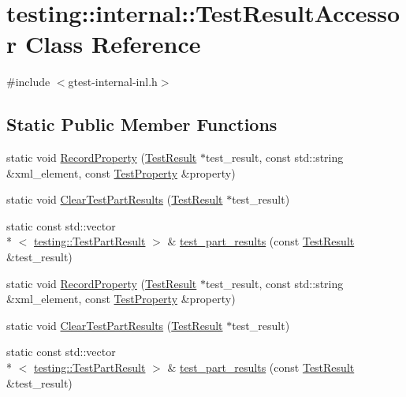 \hypertarget{classtesting_1_1internal_1_1_test_result_accessor}{\section{testing\-:\-:internal\-:\-:Test\-Result\-Accessor Class Reference}
\label{classtesting_1_1internal_1_1_test_result_accessor}
}


{\ttfamily \#include $<$gtest-\/internal-\/inl.\-h$>$}

\subsection*{Static Public Member Functions}
\begin{DoxyCompactItemize}
\item 
static void \hyperlink{classtesting_1_1internal_1_1_test_result_accessor_abcc4b32d1b201eeef92f0ec0ae161cf9}{Record\-Property} (\hyperlink{classtesting_1_1_test_result}{Test\-Result} $\ast$test\-\_\-result, const std\-::string \&xml\-\_\-element, const \hyperlink{classtesting_1_1_test_property}{Test\-Property} \&property)
\item 
static void \hyperlink{classtesting_1_1internal_1_1_test_result_accessor_a53c626632bac65d82d88e432072b866b}{Clear\-Test\-Part\-Results} (\hyperlink{classtesting_1_1_test_result}{Test\-Result} $\ast$test\-\_\-result)
\item 
static const std\-::vector\\*
$<$ \hyperlink{classtesting_1_1_test_part_result}{testing\-::\-Test\-Part\-Result} $>$ \& \hyperlink{classtesting_1_1internal_1_1_test_result_accessor_a55d771904317c1b0cc380104d175f1db}{test\-\_\-part\-\_\-results} (const \hyperlink{classtesting_1_1_test_result}{Test\-Result} \&test\-\_\-result)
\item 
static void \hyperlink{classtesting_1_1internal_1_1_test_result_accessor_abcc4b32d1b201eeef92f0ec0ae161cf9}{Record\-Property} (\hyperlink{classtesting_1_1_test_result}{Test\-Result} $\ast$test\-\_\-result, const std\-::string \&xml\-\_\-element, const \hyperlink{classtesting_1_1_test_property}{Test\-Property} \&property)
\item 
static void \hyperlink{classtesting_1_1internal_1_1_test_result_accessor_a53c626632bac65d82d88e432072b866b}{Clear\-Test\-Part\-Results} (\hyperlink{classtesting_1_1_test_result}{Test\-Result} $\ast$test\-\_\-result)
\item 
static const std\-::vector\\*
$<$ \hyperlink{classtesting_1_1_test_part_result}{testing\-::\-Test\-Part\-Result} $>$ \& \hyperlink{classtesting_1_1internal_1_1_test_result_accessor_a55d771904317c1b0cc380104d175f1db}{test\-\_\-part\-\_\-results} (const \hyperlink{classtesting_1_1_test_result}{Test\-Result} \&test\-\_\-result)
\end{DoxyCompactItemize}


